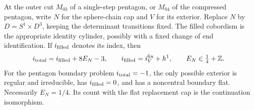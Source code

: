 \begin{lemma}
\label{lem:ordinary:flat-replacement}
At the outer cut $M_{03}$ of a single-step pentagon, or $M_{04}$
of the compressed pentagon, write $N$ for the sphere-chain cap
and $V$ for its exterior.  Replace $N$ by $D=S^1\times D^3$,
keeping the determinant transitions fixed.  The filled cobordism
is the appropriate identity cylinder, possibly with a fixed
change of end identification.  If $i_{\rm filled}$ denotes its
index, then
\begin{equation}\label{eq:ordinary:hard-index}
 i_{\rm total}=i_{\rm filled}+8E_N-3,
 \qquad i_{\rm filled}=i_V^{\rm fix}+h^1,
 \qquad E_N\in\tfrac14+\mathbb Z.
\end{equation}
For the pentagon boundary problem $i_{\rm total}=-1$, the only
possible exterior is regular and irreducible, has
$i_{\rm filled}=0$, and has a noncentral boundary flat.
Necessarily $E_N=1/4$.  Its count with the flat replacement cap
is the continuation isomorphism.
\end{lemma}
